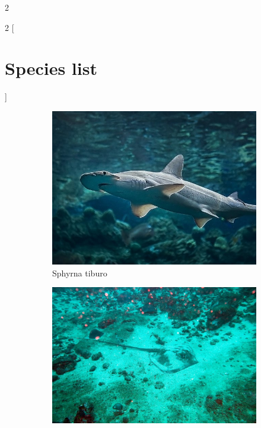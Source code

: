 \documentclass[10pt]{article}
\begin{document}
\begin{multicols}{2}
\blindtext
\blindtext
\end{multicols}

\clearpage

\begin{multicols}{2}
[\section{Species list}]
\end{multicols}



\begin{figure}
     \centering
     \begin{subfigure}[b]{0.45\textwidth}
         \centering
         \includegraphics[width=\textwidth]{images/sphyrna_tiburo.jpg}
         \caption{Sphyrna tiburo}
     \end{subfigure}
     \hfill
     \begin{subfigure}[b]{0.45\textwidth}
         \centering
         \includegraphics[width=\textwidth]{images/hypanus_rudis.jpg}

\end{subfigure}
\end{figure}
\end{document}
